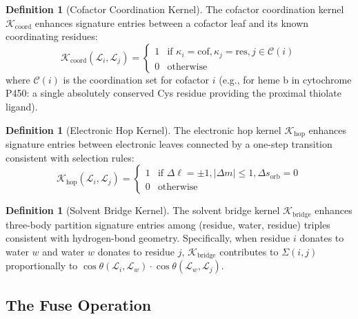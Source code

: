 \documentclass[11pt,twocolumn,a4paper]{article}
\theoremstyle{definition}
\newtheorem{definition}[theorem]{Definition}
\theoremstyle{remark}
\newcommand{\catalyst}{\mathcal{K}}
\newcommand{\Sig}{\Sigma}
\newcommand{\Leaf}{\mathcal{L}}
\begin{document}
\begin{definition}[Cofactor Coordination Kernel]
\label{def:cof_kernel}
The cofactor coordination kernel $\catalyst_{\mathrm{coord}}$ enhances signature entries between a cofactor leaf and its known coordinating residues:
\begin{equation}
\catalyst_{\mathrm{coord}}(\Leaf_i, \Leaf_j) = \begin{cases}
1 & \text{if } \kappa_i = \mathrm{cof}, \kappa_j = \mathrm{res}, j \in \mathcal{C}(i) \\
0 & \text{otherwise}
\end{cases}
\end{equation}
where $\mathcal{C}(i)$ is the coordination set for cofactor $i$ (e.g., for heme b in cytochrome P450: a single absolutely conserved Cys residue providing the proximal thiolate ligand).
\end{definition}

\begin{definition}[Electronic Hop Kernel]
\label{def:hop_kernel}
The electronic hop kernel $\catalyst_{\mathrm{hop}}$ enhances signature entries between electronic leaves connected by a one-step transition consistent with selection rules:
\begin{equation}
\catalyst_{\mathrm{hop}}(\Leaf_i, \Leaf_j) = \begin{cases}
1 & \text{if } \Delta\ell = \pm 1, |\Delta m| \leq 1, \Delta s_{\mathrm{orb}} = 0 \\
0 & \text{otherwise}
\end{cases}
\end{equation}
\end{definition}

\begin{definition}[Solvent Bridge Kernel]
\label{def:sol_kernel}
The solvent bridge kernel $\catalyst_{\mathrm{bridge}}$ enhances three-body partition signature entries among (residue, water, residue) triples consistent with hydrogen-bond geometry. Specifically, when residue $i$ donates to water $w$ and water $w$ donates to residue $j$, $\catalyst_{\mathrm{bridge}}$ contributes to $\Sig(i, j)$ proportionally to $\cos\theta(\Leaf_i, \Leaf_w) \cdot \cos\theta(\Leaf_w, \Leaf_j)$.
\end{definition}

\subsection{The Fuse Operation}
\end{document}
